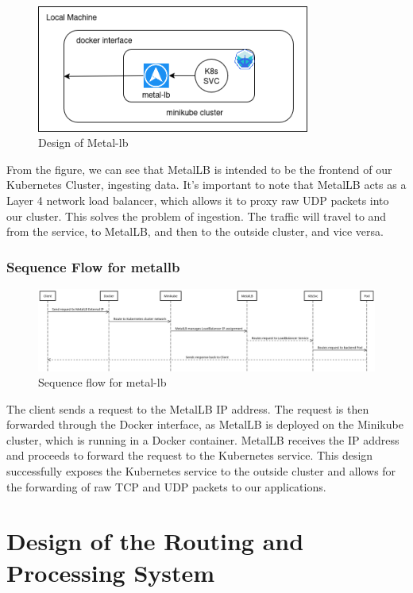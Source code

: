 \begin{figure}[H]
\caption{Design of Metal-lb}
\centering
\includegraphics[width=0.8\textwidth]{Design/metal.png}
\end{figure}

From the figure, we can see that MetalLB is intended to be the frontend of our Kubernetes Cluster, ingesting data. It's important to note that MetalLB acts as a Layer 4 network load balancer, which allows it to proxy raw UDP packets into our cluster. This solves the problem of ingestion. The traffic will travel to and from the service, to MetalLB, and then to the outside cluster, and vice versa.



\subsubsection{Sequence Flow for metallb}
\begin{figure}[H]
\caption{Sequence flow for metal-lb}
\centering
\includegraphics[width=1\textwidth]{Design/metal_sequence.png}
\end{figure}

The client sends a request to the MetalLB IP address. The request is then forwarded through the Docker interface, as MetalLB is deployed on the Minikube cluster, which is running in a Docker container. MetalLB receives the IP address and proceeds to forward the request to the Kubernetes service. This design successfully exposes the Kubernetes service to the outside cluster and allows for the forwarding of raw TCP and UDP packets to our applications.

\section{Design of the Routing and Processing System}

